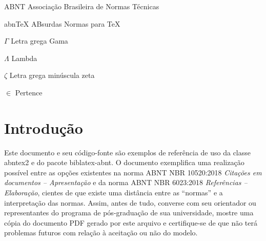 \documentclass[
	12pt,				%
	openright,			%
	oneside,			%
	a4paper,			%
	english,			%
	brazil				%
	]{abntex2}
\begin{document}
\listoffigures*
\cleardoublepage

\listoftables*
\cleardoublepage


\begin{siglas}
  \item[ABNT] Associação Brasileira de Normas Técnicas
  \item[abnTeX] ABsurdas Normas para TeX
\end{siglas}

\begin{simbolos}
  \item[$ \Gamma $] Letra grega Gama
  \item[$ \Lambda $] Lambda
  \item[$ \zeta $] Letra grega minúscula zeta
  \item[$ \in $] Pertence
\end{simbolos}

\tableofcontents*
\cleardoublepage


\makeatletter
{}
\makeatother




\textual


\chapter[Introdução]{Introdução}

Este documento e seu código-fonte são exemplos de referência de uso da classe \textsf{abntex2} e do pacote \textsf{biblatex-abnt}. O documento exemplifica uma realização possível entre as opções existentes na norma ABNT NBR 10520:2018 \emph{Citações em documentos -- Apresentação} e da norma ABNT NBR 6023:2018 \emph{Referências -- Elaboração}, cientes de que existe uma distância entre as ``normas'' e a interpretação das normas. Assim, antes de tudo, converse com seu orientador ou representantes do programa de pós-graduação de sua universidade, mostre uma cópia do documento PDF gerado por este arquivo e certifique-se de que não terá problemas futuros com relação à aceitação ou não do modelo.
\end{document}
